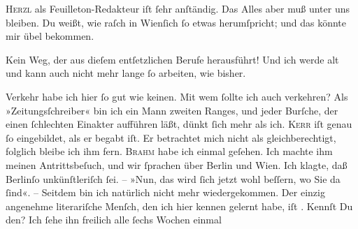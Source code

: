 \pstart
           \textsc{Herzl} als Feuilleton-Redakteur
               iſt{ }ſehr anſtändig. Das Alles aber muß unter uns bleiben. Du weißt, wie raſch in Wienſich{ }ſo etwas herumſpricht; und das könnte mir
               übel bekommen.\pend
           
\pstart
           Kein Weg, der aus dieſem entſetzlichen Berufe herausführt! Und ich werde alt und kann
               auch nicht mehr lange{ }ſo arbeiten, wie bisher.\pend
           
\pstart
           Verkehr habe ich hier{ }ſo gut wie keinen. {\pb}Mit wem{ }ſollte ich auch verkehren? Als »Zeitungsſchreiber« bin ich ein Mann zweiten Ranges,
               und jeder Burſche, der einen{ }ſchlechten Einakter aufführen läßt, dünkt{ }ſich mehr als
               ich. \textsc{Kerr} iſt genau{ }ſo eingebildet, als er begabt iſt. Er betrachtet mich nicht als
               gleichberechtigt, folglich bleibe ich ihm fern. \textsc{Brahm} habe ich einmal geſehen. Ich machte ihm meinen Antrittsbeſuch, und  wir{ }ſprachen über Berlin und Wien. Ich klagte, daß Berlinſo unkünſtleriſch{ }ſei. – »Nun, das wird{ }ſich jetzt wohl
               beſſern, wo Sie da{ }ſind«. – Seitdem bin ich natürlich nicht mehr wiedergekommen. Der
               einzig angenehme literariſche Menſch, den ich hier kennen gelernt habe, iſt \label{K_L02907-6v}\label{K_L02907-6}.
               Kennſt Du den? Ich{ }ſehe ihn freilich alle{ }ſechs Wochen einmal{\dotsfour}\pend
           
